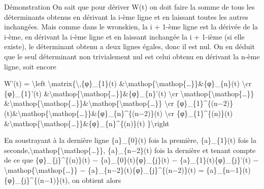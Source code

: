 \documentclass[]{article}
\begin{document}
Démonstration On sait que pour dériver W(t) on doit faire la somme de
tous les déterminants obtenus en dérivant la i-ème ligne et en laissant
toutes les autres inchangées. Mais comme dans le wronskien, la i + 1-ème
ligne est la dérivée de la i-ème, en dérivant la i-ème ligne et en
laissant inchangée la i + 1-ième (si elle existe), le déterminant obtenu
a deux lignes égales, donc il est nul. On en déduit que le seul
déterminant non trivialement nul est celui obtenu en dérivant la n-ème
ligne, soit encore

W'(t) = \textbackslash{}left
\textbar{}\textbackslash{}matrix\{\textbackslash{},\{φ\}\_\{1\}(t)
\&\textbackslash{}mathop\{\textbackslash{}mathop\{\ldots{}\}\}\&\{φ\}\_\{n\}(t)
\textbackslash{}cr \{φ\}\_\{1\}'(t)
\&\textbackslash{}mathop\{\textbackslash{}mathop\{\ldots{}\}\}\&\{φ\}\_\{n\}'(t)
\textbackslash{}cr
\textbackslash{}mathop\{\textbackslash{}mathop\{\ldots{}\}\}
\&\textbackslash{}mathop\{\textbackslash{}mathop\{\ldots{}\}\}\&\textbackslash{}mathop\{\textbackslash{}mathop\{\ldots{}\}\}
\textbackslash{}cr
\{φ\}\_\{1\}\^{}\{(n−2)\}(t)\&\textbackslash{}mathop\{\textbackslash{}mathop\{\ldots{}\}\}\&\{φ\}\_\{n\}\^{}\{(n−2)\}(t)
\textbackslash{}cr \{φ\}\_\{1\}\^{}\{(n)\}(t)
\&\textbackslash{}mathop\{\textbackslash{}mathop\{\ldots{}\}\}\&\{φ\}\_\{n\}\^{}\{(n)\}(t)
\}\textbackslash{}right \textbar{}

En soustrayant à la dernière ligne \{a\}\_\{0\}(t) fois la première,
\{a\}\_\{1\}(t) fois la
seconde,\textbackslash{}mathop\{\textbackslash{}mathop\{\ldots{}\}\},
\{a\}\_\{n−2\}(t) fois la dernière et tenant compte de ce que
\{φ\}\_\{j\}\^{}\{(n)\}(t) − \{a\}\_\{0\}(t)\{φ\}\_\{j\}(t) −
\{a\}\_\{1\}(t)\{φ\}\_\{j\}'(t)
−\textbackslash{}mathop\{\textbackslash{}mathop\{\ldots{}\}\} −
\{a\}\_\{n−2\}(t)\{φ\}\_\{j\}\^{}\{(n−2)\}(t) =
\{a\}\_\{n−1\}(t)\{φ\}\_\{j\}\^{}\{(n−1)\}(t), on obtient alors
\end{document}
